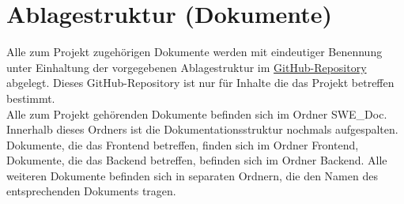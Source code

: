 
\chapter{Ablagestruktur (Dokumente)}

Alle zum Projekt zugehörigen Dokumente werden mit eindeutiger Benennung unter Einhaltung der vorgegebenen Ablagestruktur im \href{https://github.com/LucRome/SWE_Semester4}{GitHub-Repository} abgelegt. Dieses \gls{GitHub}-\gls{Repository} ist nur für Inhalte die das Projekt betreffen bestimmt.\\

Alle zum Projekt gehörenden Dokumente befinden sich im Ordner \glqq SWE\_Doc\grqq. \\
Innerhalb dieses Ordners ist die Dokumentationsstruktur nochmals aufgespalten. Dokumente, die das \gls{Frontend} betreffen, finden sich im Ordner \glqq \gls{Frontend}\grqq , Dokumente, die das \gls{Backend} betreffen, befinden sich im Ordner \glqq \gls{Backend}\grqq. Alle weiteren Dokumente befinden sich in separaten Ordnern, die den Namen des entsprechenden Dokuments tragen.\\
